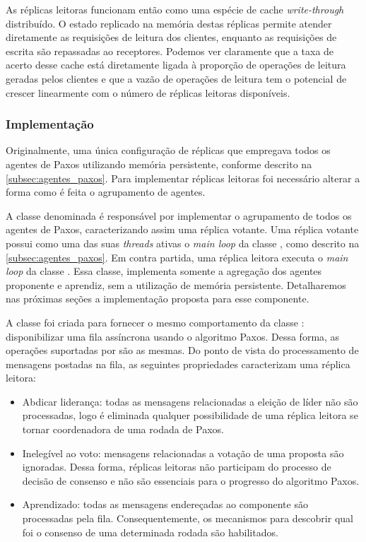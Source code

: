 As réplicas leitoras funcionam então como uma espécie de cache \emph{write-through}
distribuído. O estado replicado na memória destas réplicas permite atender diretamente as
requisições de leitura dos clientes, enquanto as requisições de escrita são repassadas ao
receptores. Podemos ver claramente que a taxa de acerto desse cache está diretamente
ligada à proporção de operações de leitura geradas pelos clientes e que a vazão de
operações de leitura tem o potencial de crescer linearmente com o número de réplicas
leitoras disponíveis.

\subsubsection{Implementação}

Originalmente, uma única configuração de réplicas que empregava todos os agentes de Paxos
utilizando memória persistente, conforme descrito na \autoref{subsec:agentes_paxos}. Para
implementar réplicas leitoras foi necessário alterar a forma como é feita o agrupamento de
agentes.

A classe denominada  é responsável por implementar o
agrupamento de todos os agentes de Paxos, caracterizando assim uma réplica votante. Uma
réplica votante possui como uma das suas \emph{threads} ativas o \emph{main loop} da classe
, como descrito na \autoref{subsec:agentes_paxos}. Em
contra partida, uma réplica leitora executa o \emph{main loop} da classe
. Essa classe, implementa somente a agregação dos agentes
proponente e aprendiz, sem a utilização de memória persistente. Detalharemos nas próximas
seções a implementação proposta para esse componente.


A classe  foi criada para fornecer o mesmo comportamento da
classe : disponibilizar uma fila assíncrona usando o
algoritmo Paxos. Dessa forma, as operações suportadas por 
são as mesmas. Do ponto de vista do processamento de mensagens postadas na fila, as
seguintes propriedades caracterizam uma réplica leitora:

\begin{itemize}
  \item Abdicar liderança: todas as mensagens relacionadas a eleição de líder não são
    processadas, logo é eliminada qualquer possibilidade de uma réplica leitora se tornar
    coordenadora de uma rodada de Paxos.
  \item Inelegível ao voto: mensagens relacionadas a votação de uma proposta são
    ignoradas. Dessa forma, réplicas leitoras não participam do processo de decisão de
    consenso e não são essenciais para o progresso do algoritmo Paxos.
  \item Aprendizado: todas as mensagens endereçadas ao componente  são
    processadas pela fila. Consequentemente, os mecanismos para descobrir qual foi o
    consenso de uma determinada rodada são habilitados.
\end{itemize}

